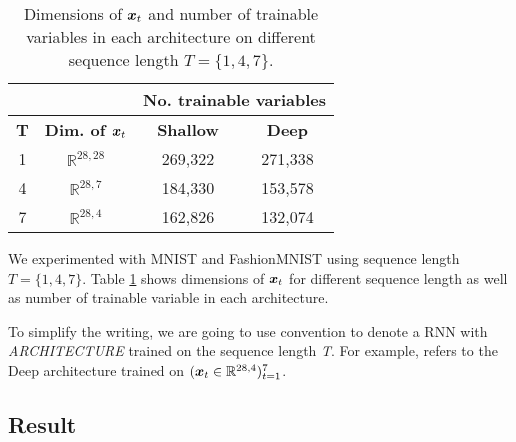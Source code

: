 \renewcommand{\arraystretch}{1.5}
\begin{table}[h]
\centering
\begin{tabular}{cc|c|c|}
\cline{3-4}
& & \multicolumn{2}{c|}{\textbf{No. trainable variables}}                                                                \\ \hline
\multicolumn{1}{|c|}{\textbf{T}}               & \multicolumn{1}{c|}{\textbf{Dim. of $\boldsymbol{x}_t$}} & \multicolumn{1}{c|}{\textbf{Shallow}} & \multicolumn{1}{c|}{\textbf{Deep}}  \\ \hline
\multicolumn{1}{|c|}{1} & $\mathbb{R}^{28,28}$ & 269,322  &  271,338 \\
\multicolumn{1}{|c|}{4} & $\mathbb{R}^{28,7}$ & 184,330 & 153,578 \\
\multicolumn{1}{|c|}{7} & $\mathbb{R}^{28,4}$ & 162,826 & 132,074 \\ \hline

\end{tabular}
\caption{Dimensions of $\patvector{x}_t$ and number of trainable variables in each architecture on different sequence length $T=\{1, 4, 7\}$.}
\label{tab:seq-length}
\end{table}
\renewcommand{\arraystretch}{1}




We experimented with MNIST and FashionMNIST using sequence length $T = \{1, 4, 7\}$.  Table \ref{tab:seq-length} shows dimensions of $\patvector{x}_t$ for different sequence length as well as number of trainable variable in each architecture.

To simplify the writing, we are going to use \textit{} convention to denote a RNN with \textit{ARCHITECTURE} trained on the sequence length \textit{T}. For example,  refers to the Deep architecture trained on $(\boldsymbol{x}_t \in \mathbb{R}^{28,4} )_{t=1}^{7}$.

\subsection{Result}
\label{sec:exp1_result}

